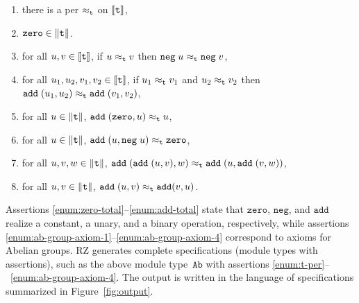 \begin{enumerate}
\item
  \label{enum:t-per}%
  there is a per $\approx_{\mathtt{t}}$ on $[\![\mathtt{t}]\!]$,
\item
  \label{enum:zero-total}%
  $\mathtt{zero} \in \|\mathtt{t}\|$.
\item
  \label{enum:neg-total}%
  for all $u, v \in [\![\mathtt{t}]\!]$, if $u \approx_{\mathtt{t}} v$ then
  $\mathtt{neg} \; u \approx_{\mathtt{t}} \mathtt{neg} \; v$,
\item
  \label{enum:add-total}%
  for all $u_1, u_2, v_1, v_2 \in [\![\mathtt{t}]\!]$, if $u_1
  \approx_{\mathtt{t}} v_1$ and $u_2 \approx_{\mathtt{t}} v_2$ then $\mathtt{add} \; (u_1,
  u_2) \approx_{\mathtt{t}} \mathtt{add} \; (v_1, v_2)$,
\item 
  \label{enum:ab-group-axiom-1}%
  for all $u \in \|\mathtt{t}\|$, $\mathtt{add} \;
  (\mathtt{zero}, u) \approx_{\mathtt{t}} u$,
\item
  \label{enum:ab-group-axiom-2}%
  for all $u \in \|\mathtt{t}\|$, $\mathtt{add} \; (u,
  \mathtt{neg} \; u) \approx_{\mathtt{t}} \mathtt{zero}$,
\item
  \label{enum:ab-group-axiom-3}%
  for all $u, v, w \in \|\mathtt{t}\|$, $\mathtt{add} \;
  (\mathtt{add} \; (u, v), w) \approx_{\mathtt{t}} \mathtt{add} \; (u,
  \mathtt{add} \; (v, w))$,
\item
  \label{enum:ab-group-axiom-4}%
  for all $u, v \in \|\mathtt{t}\|$, $\mathtt{add} \; (u, v)
  \approx_{\mathtt{t}} \mathtt{add} (v, u)$.
\end{enumerate}
%
Assertions \ref{enum:zero-total}--\ref{enum:add-total} state that
$\mathtt{zero}$, $\mathtt{neg}$, and $\mathtt{add}$ realize a
constant, a unary, and a binary operation, respectively, while
assertions \ref{enum:ab-group-axiom-1}--\ref{enum:ab-group-axiom-4}
correspond to axioms for Abelian groups. RZ generates complete
specifications (module types with assertions), such as the above
module type~$\mathtt{Ab}$ with assertions
\ref{enum:t-per}--~\ref{enum:ab-group-axiom-4}. The output is written
in the language of specifications summarized in
Figure~\ref{fig:output}.

